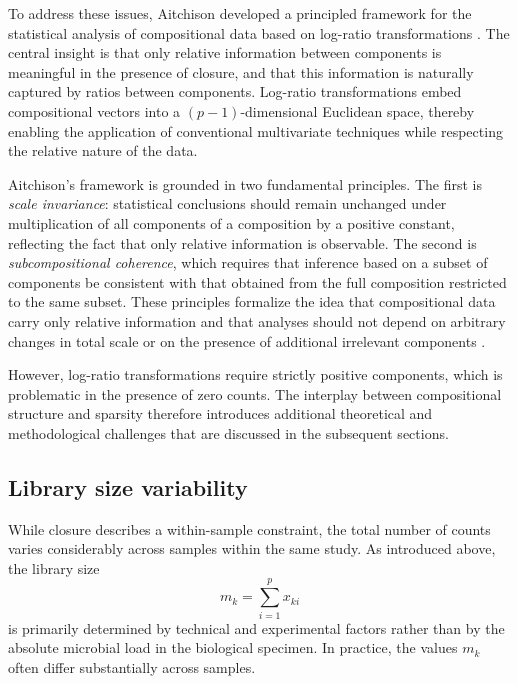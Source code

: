 To address these issues, Aitchison developed a principled framework for the statistical analysis of compositional data based on log-ratio transformations \citep{aitchison1982statistical}. 
The central insight is that only relative information between components is meaningful in the presence of closure, and that this information is naturally captured by ratios between components. 
Log-ratio transformations embed compositional vectors into a $(p-1)$-dimensional Euclidean space, thereby enabling the application of conventional multivariate techniques while respecting the relative nature of the data.

Aitchison’s framework is grounded in two fundamental principles. 
The first is \emph{scale invariance}: statistical conclusions should remain unchanged under multiplication of all components of a composition by a positive constant, reflecting the fact that only relative information is observable. 
The second is \emph{subcompositional coherence}, which requires that inference based on a subset of components be consistent with that obtained from the full composition restricted to the same subset. 
These principles formalize the idea that compositional data carry only relative information and that analyses should not depend on arbitrary changes in total scale or on the presence of additional irrelevant components \citep{aitchison1982statistical,greenacre2023aitchisons}.

However, log-ratio transformations require strictly positive components, which is problematic in the presence of zero counts. 
The interplay between compositional structure and sparsity therefore introduces additional theoretical and methodological challenges that are discussed in the subsequent sections.

\subsection{Library size variability}
\label{sec:2micro:charact:librarysize}

While closure describes a within-sample constraint, the total number of counts varies considerably across samples within the same study. 
As introduced above, the library size
\[
m_k = \sum_{i=1}^{p} x_{ki}
\]
is primarily determined by technical and experimental factors rather than by the absolute microbial load in the biological specimen. In practice, the values $m_k$ often differ substantially across samples.

